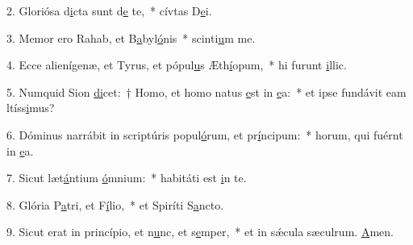 2. Gloriósa d\uline{i}cta sunt d\uline{e} te,~* cívtas D\uline{e}i.\par 
3. Memor ero Rahab, et B\uline{a}byl\uline{ó}nis~* scinti\uline{u}m me.\par 
4. Ecce alienígenæ, et Tyrus, et pópul\uline{u}s Æth\uline{í}opum,~* hi furunt \uline{i}llic.\par 
5. Numquid Sion \uline{di}cet:~† Homo, et homo natus \uline{e}st in \uline{e}a:~* et ipse fundávit eam ltíss\uline{i}mus?\par 
6. Dóminus narrábit in scriptúris popul\uline{ó}rum, et pr\uline{í}ncipum:~* horum, qui fuérnt in \uline{e}a.\par 
7. Sicut læt\uline{á}ntium \uline{ó}mnium:~* habitáti est \uline{i}n te.\par 
8. Glória P\uline{a}tri, et F\uline{í}lio,~* et Spiríti S\uline{a}ncto.\par 
9. Sicut erat in princípio, et n\uline{u}nc, et s\uline{e}mper,~* et in sǽcula sæculrum. \uline{A}men.\par 
